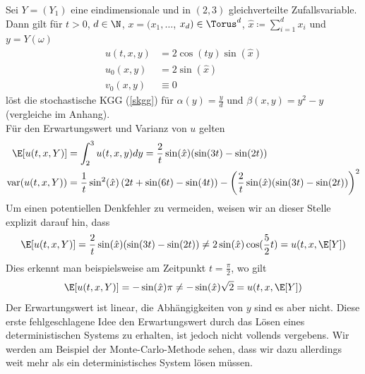 \begin{mathbsp}
\label{bsp:trial1}
Sei $Y=(Y_1)$ eine eindimensionale und in $(2,3)$ gleichverteilte Zufallsvariable. Dann gilt für $t>0$, $d\in\N$, $x=(x_1,\dots$, $x_d)\in\Torus^d$, $\hat{x}\coloneqq \sum_{i=1}^d x_i$ und $y=Y(\omega)$
\begin{align*}
u(t,x,y)&=2\cos(ty)\sin(\hat{x})\\
u_0(x,y)&=2\sin(\hat{x})\\
v_0(x,y)&\equiv 0
\end{align*}
löst die stochastische KGG (\ref{skgg}) für $\alpha(y)=\frac{y}{d}$ und $\beta(x,y)=y^2-y$ (vergleiche  im Anhang).\\
Für den Erwartungswert und Varianz von $u$ gelten
\begin{align*}
\E[u(t,x,Y)]&=\int_2^3u(t,x,y)dy=\frac{2}{t}\sin(\hat{x})(\sin(3t) - \sin(2t))\\
\text{var}(u(t,x,Y))&=\frac{1}{t}\sin^2(\hat{x})\left(2t + \sin(6t) - \sin(4t)\right)- \left(\frac{2}{t}\sin(\hat{x})(\sin(3t) - \sin(2t))\right)^2
\end{align*}
Um einen potentiellen Denkfehler zu vermeiden, weisen wir an dieser Stelle explizit darauf hin, dass 
\[\E[u(t,x,Y)]=\frac{2}{t}\sin(\hat{x})(\sin(3t) - \sin(2t))\neq 2\sin(\hat{x})\cos(\frac{5}{2}t)=u(t,x,\E[Y])\]
Dies erkennt man beispielsweise am Zeitpunkt $t=\frac{\pi}{2}$, wo gilt
\[\E[u(t,x,Y)]=-\sin(\hat{x})\pi \neq -\sin(\hat{x})\sqrt{2}=u(t,x,\E[Y])\]
Der Erwartungswert ist linear, die Abhängigkeiten von $y$ sind es aber nicht. Diese erste fehlgeschlagene Idee den Erwartungswert durch das Lösen eines deterministischen Systems zu erhalten, ist jedoch nicht vollends vergebens. Wir werden am Beispiel der Monte-Carlo-Methode sehen, dass wir dazu allerdings weit mehr als ein deterministisches System lösen müssen.
\end{mathbsp}

